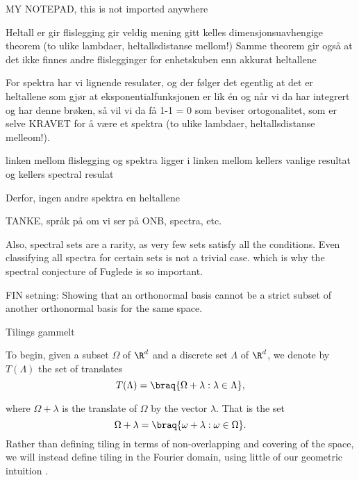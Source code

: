

MY NOTEPAD, this is not imported anywhere

Heltall er gir flislegging gir veldig mening gitt kelles dimensjonsuavhengige theorem (to ulike lambdaer, heltallsdistanse mellom!)
Samme theorem gir også at det ikke finnes andre flislegginger for enhetskuben enn akkurat heltallene

For spektra har vi lignende resulater, og der følger det egentlig at det er heltallene som gjør at eksponentialfunksjonen er lik én
og når vi da har integrert og har denne brøken, så vil vi da få 1-1 = 0 som beviser ortogonalitet, som er selve KRAVET for å være et spektra
(to ulike lambdaer, heltallsdistanse melleom!). 


linken mellom flislegging og spektra ligger i linken mellom kellers vanlige resultat og kellers spectral resulat

Derfor, ingen andre spektra en heltallene

TANKE, språk på om vi ser på ONB, spectra, etc.

Also, spectral sets are a rarity, as very few sets satisfy all the conditions. 
Even classifying all spectra for certain sets is not a trivial case. which is why the spectral conjecture of Fuglede is so important. 


FIN setning: Showing that an orthonormal basis cannot be a strict subset of another orthonormal basis for the same space. 


Tilings gammelt

To begin, given a subset $\Omega$ of $\R^d$ and a discrete set $\Lambda$ of $\R^d$, we denote by $T(\Lambda)$ the set of translates 
\begin{equation*}
    T(\Lambda) = \braq{\Omega+\lambda : \lambda\in \Lambda},
\end{equation*}

where $\Omega + \lambda$ is the translate of $\Omega$ by the vector $\lambda$. That is the set
\begin{equation*}
    \Omega + \lambda = \braq{\omega + \lambda : \omega \in \Omega}.
\end{equation*}
Rather than defining tiling in terms of non-overlapping and covering of the space, we will instead define tiling in the Fourier domain, using little of our geometric intuition \cite{kolountzakisTilingsTranslation2010} \cite{kolountzakisStudyTranslationalTiling2003}. 

